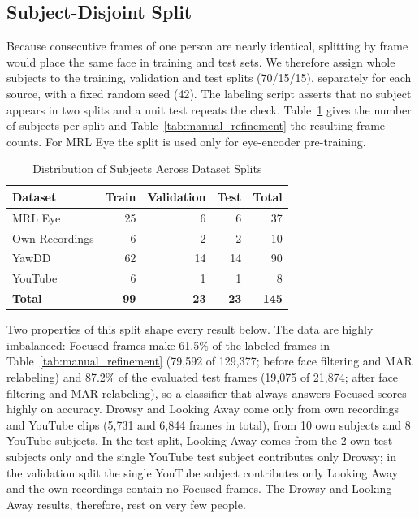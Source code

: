 \documentclass[conference]{IEEEtran}
\begin{document}
\subsection{Subject-Disjoint Split}\label{sec:split}
Because consecutive frames of one person are nearly identical, splitting by frame would place the same face in training and test sets. We therefore assign whole subjects to the training, validation and test splits (70/15/15), separately for each source, with a fixed random seed (42). The labeling script asserts that no subject appears in two splits and a unit test repeats the check. Table~\ref{tab:subject_distribution} gives the number of subjects per split and Table~\ref{tab:manual_refinement} the resulting frame counts. For MRL Eye the split is used only for eye-encoder pre-training.

\begin{table}[t]
\caption{Distribution of Subjects Across Dataset Splits}
\label{tab:subject_distribution}
\centering
\begin{tabular}{|l|r|r|r|r|}
\hline
\textbf{Dataset} & \textbf{Train} & \textbf{Validation} &
\textbf{Test} & \textbf{Total} \\
\hline
MRL Eye & 25 & 6 & 6 & 37 \\
Own Recordings & 6 & 2 & 2 & 10 \\
YawDD & 62 & 14 & 14 & 90 \\
YouTube & 6 & 1 & 1 & 8 \\
\hline
\textbf{Total} & \textbf{99} & \textbf{23} &
\textbf{23} & \textbf{145} \\
\hline
\end{tabular}
\end{table}

Two properties of this split shape every result below. The data are highly imbalanced: Focused frames make 61.5\% of the labeled frames in Table~\ref{tab:manual_refinement} (79,592 of 129,377; before face filtering and MAR relabeling) and 87.2\% of the evaluated test frames (19,075 of 21,874; after face filtering and MAR relabeling), so a classifier that always answers Focused scores highly on accuracy. Drowsy and Looking Away come only from own recordings and YouTube clips (5,731 and 6,844 frames in total), from 10 own subjects and 8 YouTube subjects. In the test split, Looking Away comes from the 2 own test subjects only and the single YouTube test subject contributes only Drowsy; in the validation split the single YouTube subject contributes only Looking Away and the own recordings contain no Focused frames. The Drowsy and Looking Away results, therefore, rest on very few people.
\end{document}
